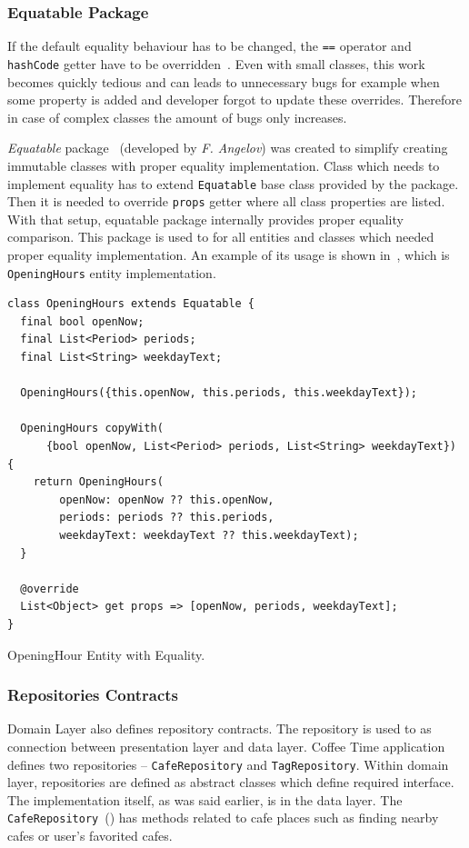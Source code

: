 \subsubsection{Equatable Package}
If the default equality behaviour has to be changed, the \verb|==| operator and \verb|hashCode| getter have to be overridden~\cite{dart-equality}.
Even with small classes, this work becomes quickly tedious and can leads to unnecessary bugs for example when some property is added and developer forgot to update these overrides. Therefore in case of complex classes the amount of bugs only increases. 

\textit{Equatable} package~\cite{package-equatable} (developed by \textit{F. Angelov}) was created to simplify creating immutable classes with proper equality implementation. Class which needs to implement equality has to extend \verb|Equatable| base class provided by the package. Then it is needed to override \verb|props| getter where all class properties are listed. With that setup, equatable package internally provides proper equality comparison. This package is used to for all entities and classes which needed proper equality implementation. An example of its usage is shown in~, which is \verb|OpeningHours| entity implementation. 

\begin{listing}[ht]
\begin{verbatim}
class OpeningHours extends Equatable {
  final bool openNow;
  final List<Period> periods;
  final List<String> weekdayText;

  OpeningHours({this.openNow, this.periods, this.weekdayText});

  OpeningHours copyWith(
      {bool openNow, List<Period> periods, List<String> weekdayText}) {
    return OpeningHours(
        openNow: openNow ?? this.openNow,
        periods: periods ?? this.periods,
        weekdayText: weekdayText ?? this.weekdayText);
  }

  @override
  List<Object> get props => [openNow, periods, weekdayText];
}
\end{verbatim}
\caption{OpeningHour Entity with Equality.}
\label{listing:ct-opening-hour-entity}
\end{listing}

\subsubsection{Repositories Contracts}
Domain Layer also defines repository contracts. The repository is used to as connection between presentation layer and data layer. Coffee Time application defines two repositories -- \verb|CafeRepository| and \verb|TagRepository|. Within domain layer, repositories are defined as abstract classes which define required interface. The implementation itself, as was said earlier, is in the data layer. The \verb|CafeRepository|~() has methods related to cafe places such as finding nearby cafes or user's favorited cafes. 

